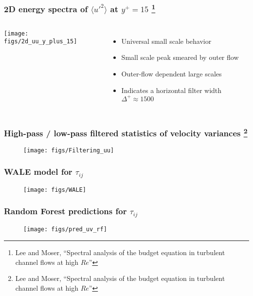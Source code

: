 \documentclass[aspectratio=169]{beamer}
\newcommand{\uu}{$\langle u'^2 \rangle$ }
\begin{document}
\begin{frame}
    \frametitle{2D energy spectra of \uu at $y^+ = 15$ \footnote{\scriptsize Lee and Moser, ``Spectral analysis of the budget equation in turbulent channel flows at high $Re$''}}
    \begin{columns}[c]
        \texttt{[image: figs/2d\_uu\_y\_plus\_15]}
        \begin{itemize}
            \item Universal small scale behavior
            \item Small scale peak smeared by outer flow
            \item Outer-flow dependent large scales
            \item Indicates a horizontal filter width $\Delta^+\approx 1500$
        \end{itemize}
    \end{columns}
\end{frame}
\begin{frame}
    \frametitle{High-pass / low-pass filtered statistics of velocity variances \footnote{\scriptsize Lee and Moser, ``Spectral analysis of the budget equation in turbulent channel flows at high $Re$''}}
    \begin{figure}
        \centering
        \texttt{[image: figs/Filtering\_uu]}
    \end{figure}
\end{frame}
\begin{frame}
    \frametitle{WALE model for $\tau_{ij}$}
    \begin{figure}
        \centering
        \texttt{[image: figs/WALE]}
    \end{figure}
\end{frame}
\begin{frame}
    \frametitle{Random Forest predictions for $\tau_{ij}$}
    \begin{figure}
        \centering
        \texttt{[image: figs/pred\_uv\_rf]}
    \end{figure}
\end{frame}
\end{document}
